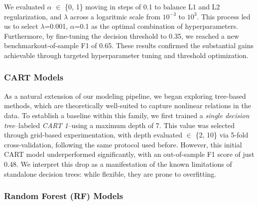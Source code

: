 \documentclass[12pt,a4paper,onecolumn]{article}
\begin{document}
We evaluated $\alpha$ $\in$ \{0, 1\} moving in steps of 0.1 to balance L1 and L2 regularization, and $\lambda$ across a logaritmic scale from $10^{-3}$ to $10^{3}$. This process led us to select
$\lambda$=0.001, $\alpha$=0.1 as the optimal combination of hyperparameters. Furthermore, by fine-tuning the decision threshold to 0.35, we reached a new benchmarkout-of-sample F1 of 0.65. These results confirmed the substantial gains achievable through targeted hyperparameter tuning and threshold optimization.

\subsubsection{CART Models}

As a natural extension of our modeling pipeline, we began exploring tree-based methods, which are theoretically well-suited to capture nonlinear relations in the data. To establish a baseline within this family, we first trained a \textit{single decision tree}--labeled \textit{CART 1}--using a maximum depth of 7. This value was selected through grid-based experimentation, with depth evaluated $\in$ \{2, 10\} via 5-fold cross-validation, following the same protocol used before. However, this initial CART model underperformed significantly, with an out-of-sample F1 score of just 0.48. We interpret this drop as a manifestation of the known limitations of standalone decision trees: while flexible, they are prone to overfitting. 


\subsubsection{Random Forest (RF) Models}
\end{document}
